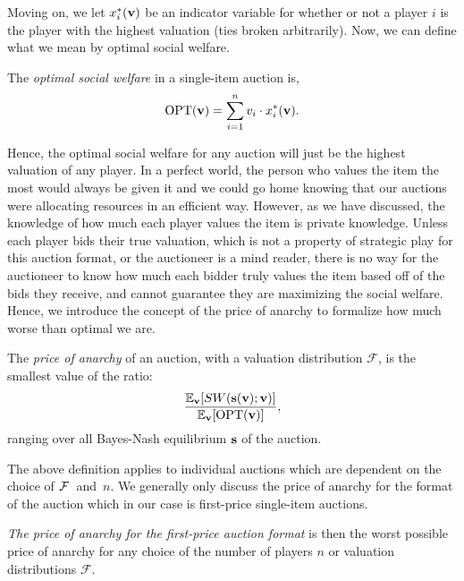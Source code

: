\documentclass[12pt,twoside]{reedthesis}
\begin{document}
Moving on, we let $x^*_i(\textbf{v})$ be an indicator variable for whether or not a player $i$ is the player with the highest valuation (ties broken arbitrarily). Now, we can define what we mean by optimal social welfare. 

\begin{dfn}
	The {\em optimal social welfare} in a single-item auction is, 
	$$ \text{OPT}( \textbf{v}) = \sum_{i=1}^{n} v_i \cdot x^*_i (\textbf{v}).$$
\end{dfn}
Hence, the optimal social welfare for any auction will just be the highest valuation of any player. In a perfect world, the person who values the item the most would always be given it and we could go home knowing that our auctions were allocating resources in an efficient way. However, as we have discussed, the knowledge of how much each player values the item is private knowledge. Unless each player bids their true valuation, which is not a property of strategic play for this auction format, or the auctioneer is a mind reader, there is no way for the auctioneer to know how much each bidder truly values the item based off of the bids they receive, and cannot guarantee they are maximizing the social welfare. Hence, we introduce the concept of the price of anarchy to formalize how much worse than optimal we are.
 
\begin{dfn}
	The \textit{price of anarchy} of an auction, with a valuation distribution $\mathcal{F}$, is the smallest value of the ratio:
	\begin{equation}
	\frac{\mathbb{E}_{\textbf{v}} [SW(\textbf{s}(\textbf{v});\textbf{v})]}{\mathbb{E}_{\textbf{v}}[\text{OPT}(\textbf{v})]},
	\end{equation}
	ranging over all Bayes-Nash equilibrium $\textbf{s}$ of the auction.
	\label{dfn:POA}
\end{dfn}

The above definition applies to individual auctions which are dependent on the choice  of $\mathcal{F}$~and~$n$. We generally only discuss the price of anarchy for the format of the auction which in our case is first-price single-item auctions.

\begin{dfn}  
{\em The price of anarchy for the first-price auction format} is then the worst possible price of anarchy for any choice of the number of players $n$ or valuation distributions $\mathcal{F}$.
\label{dfn:FormatPOA}
\end{dfn}
\end{document}

